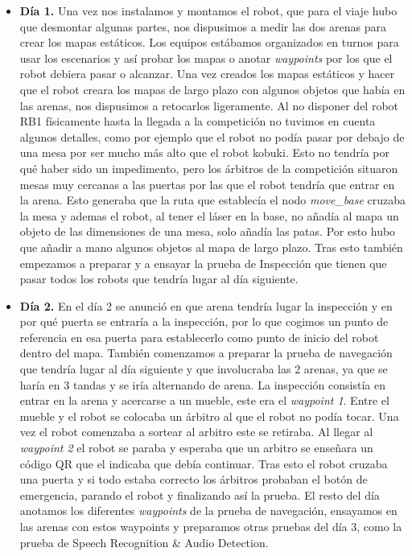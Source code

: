 \begin{itemize}
\item \textbf{Día 1.} Una vez nos instalamos y montamos el robot, que para el viaje hubo que desmontar algunas partes, nos dispusimos a medir las dos arenas para crear los mapas estáticos. Los equipos estábamos organizados en turnos para usar los escenarios y así probar los mapas o anotar \textit{waypoints} por los que el robot debiera pasar o alcanzar. Una vez creados los mapas estáticos y hacer que el robot creara los mapas de largo plazo con algunos objetos que había en las arenas, nos dispusimos a retocarlos ligeramente. Al no disponer del robot RB1 físicamente hasta la llegada a la competición no tuvimos en cuenta algunos detalles, como por ejemplo que el robot no podía pasar por debajo de una mesa por ser mucho más alto que el robot kobuki. Esto no tendría por qué haber sido un impedimento, pero los árbitros de la competición situaron mesas muy cercanas a las puertas por las que el robot tendría que entrar en la arena. Esto generaba que la ruta que establecía el nodo \textit{move\_base} cruzaba la mesa y ademas el robot, al tener el láser en la base, no añadía al mapa un objeto de las dimensiones de una mesa, solo añadía las patas. Por esto hubo que añadir a mano algunos objetos al mapa de largo plazo. Tras esto también empezamos a preparar y a ensayar la prueba de Inspección que tienen que pasar todos los robots que tendría lugar al día siguiente.
\item \textbf{Día 2.} En el día 2 se anunció en que arena tendría lugar la inspección y en por qué puerta se entraría a la inspección, por lo que cogimos un punto de referencia en esa puerta para establecerlo como punto de inicio del robot dentro del mapa. También comenzamos a preparar la prueba de navegación que tendría lugar al día siguiente y que involucraba las 2 arenas, ya que se haría en 3 tandas y se iría alternando de arena. La inspección consistía en entrar en la arena y acercarse a un mueble, este era el \textit{waypoint 1}. Entre el mueble y el robot se colocaba un árbitro al que el robot no podía tocar. Una vez el robot comenzaba a sortear al arbitro este se retiraba. Al llegar al \textit{waypoint 2} el robot se paraba y esperaba que un arbitro se enseñara un código QR que el indicaba que debía continuar. Tras esto el robot cruzaba una puerta y si todo estaba correcto los árbitros probaban el botón de emergencia, parando el robot y finalizando así la prueba. El resto del día anotamos los diferentes \textit{waypoints} de la prueba de navegación, ensayamos en las arenas con estos waypoints y preparamos otras pruebas del día 3, como la prueba de Speech Recognition \& Audio Detection.

\end{itemize}
